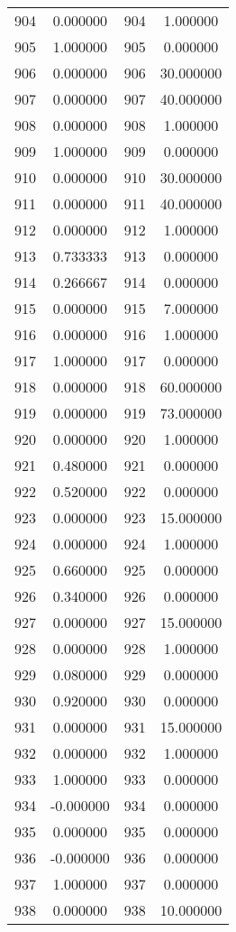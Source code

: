 \documentclass[12pt]{article}
\begin{document}
\begin{longtable}{@{}cccc@{}}
904 & 0.000000 & 904 & 1.000000 \\
905 & 1.000000 & 905 & 0.000000 \\
906 & 0.000000 & 906 & 30.000000 \\
907 & 0.000000 & 907 & 40.000000 \\
908 & 0.000000 & 908 & 1.000000 \\
909 & 1.000000 & 909 & 0.000000 \\
910 & 0.000000 & 910 & 30.000000 \\
911 & 0.000000 & 911 & 40.000000 \\
912 & 0.000000 & 912 & 1.000000 \\
913 & 0.733333 & 913 & 0.000000 \\
914 & 0.266667 & 914 & 0.000000 \\
915 & 0.000000 & 915 & 7.000000 \\
916 & 0.000000 & 916 & 1.000000 \\
917 & 1.000000 & 917 & 0.000000 \\
918 & 0.000000 & 918 & 60.000000 \\
919 & 0.000000 & 919 & 73.000000 \\
920 & 0.000000 & 920 & 1.000000 \\
921 & 0.480000 & 921 & 0.000000 \\
922 & 0.520000 & 922 & 0.000000 \\
923 & 0.000000 & 923 & 15.000000 \\
924 & 0.000000 & 924 & 1.000000 \\
925 & 0.660000 & 925 & 0.000000 \\
926 & 0.340000 & 926 & 0.000000 \\
927 & 0.000000 & 927 & 15.000000 \\
928 & 0.000000 & 928 & 1.000000 \\
929 & 0.080000 & 929 & 0.000000 \\
930 & 0.920000 & 930 & 0.000000 \\
931 & 0.000000 & 931 & 15.000000 \\
932 & 0.000000 & 932 & 1.000000 \\
933 & 1.000000 & 933 & 0.000000 \\
934 & -0.000000 & 934 & 0.000000 \\
935 & 0.000000 & 935 & 0.000000 \\
936 & -0.000000 & 936 & 0.000000 \\
937 & 1.000000 & 937 & 0.000000 \\
938 & 0.000000 & 938 & 10.000000 \\

\end{longtable}
\end{document}
